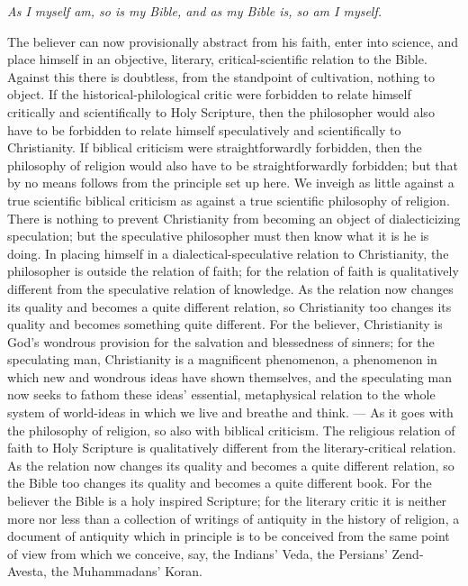 \documentclass[12pt,a4paper]{book}
\begin{document}
\emph{As I myself am, so is my Bible, and as my Bible is, so am I myself.}

The believer can now provisionally abstract from his faith, enter into science,
and place himself in an objective, literary, critical-scientific relation to
the Bible. Against this there is doubtless, from the standpoint of cultivation,
nothing to object. If the historical-philological critic were forbidden to relate
himself critically and scientifically to Holy Scripture, then the philosopher
would also have to be forbidden to relate himself speculatively and scientifically
to Christianity. If biblical criticism were straightforwardly forbidden, then the
philosophy of religion would also have to be straightforwardly forbidden;
but that by no means follows from the principle set up here. We inveigh as little
against a true scientific biblical criticism as against a true scientific
philosophy of religion. There is nothing to prevent Christianity from becoming an
object of dialecticizing speculation; but the speculative philosopher must then
know what it is he is doing. In placing himself in a dialectical-speculative
relation to Christianity, the philosopher is outside the relation of faith; for
the relation of faith is qualitatively different from the speculative relation of
knowledge. As the relation now changes its quality and becomes a quite different
relation, so Christianity too changes its quality and becomes something quite
different. For the believer, Christianity is God's wondrous provision for the
salvation and blessedness of sinners; for the speculating man, Christianity is a
magnificent phenomenon, a phenomenon in which new and wondrous ideas have shown
themselves, and the speculating man now seeks to fathom these ideas' essential,
metaphysical relation to the whole system of world-ideas in which we live and
breathe and think. --- As it goes with the philosophy of religion, so also with
biblical criticism. The religious relation of faith to Holy Scripture is
qualitatively different from the literary-critical relation. As the relation now
changes its quality and becomes a quite different relation, so the Bible too
changes its quality and becomes a quite different book. For the believer the Bible
is a holy inspired Scripture; for the literary critic it is neither more nor less
than a collection of writings of antiquity in the history of religion, a document
of antiquity which in principle is to be conceived from the same point of view
from which we conceive, say, the Indians' Veda, the Persians' Zend-Avesta, the
Muhammadans' Koran.
\end{document}
